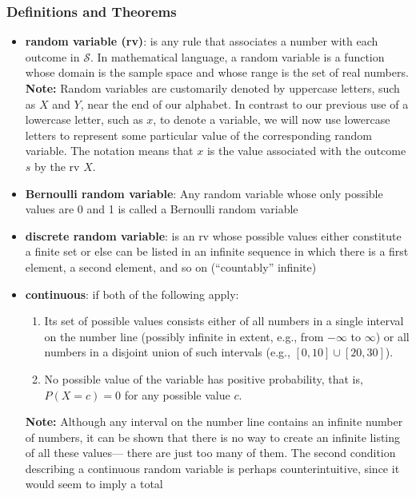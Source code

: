 \documentclass{report}
\begin{document}
    \subsubsection{Definitions and Theorems}
    \begin{itemize}
        \item \textbf{random variable (rv)}: is
            any rule that associates a number with each outcome in $\mathcal{S}$. In mathematical
            language, a random variable is a function whose domain is the sample space
            and whose range is the set of real numbers.
            \bigbreak \noindent 
            \textbf{Note:} Random variables are customarily denoted by uppercase letters, such as $X$ and
            $Y$, near the end of our alphabet. In contrast to our previous use of a lowercase letter,
            such as $x$, to denote a variable, we will now use lowercase letters to represent some
            particular value of the corresponding random variable. The notation means
            that $x$ is the value associated with the outcome $s$ by the rv $X$.
        \item \textbf{Bernoulli random variable}: Any random variable whose only possible values are 0 and 1 is called a Bernoulli random variable
        \item \textbf{discrete random variable}: is an rv whose possible values either constitute a finite set or else can be listed in an infinite sequence in which there is a first element, a second element, and so on (“countably” infinite)
        \item \textbf{continuous}: if both of the following apply:
        \begin{enumerate}
            \item Its set of possible values consists either of all numbers in a single interval on the number line (possibly infinite in extent, e.g., from $-\infty$ to $\infty$) or all numbers in a disjoint union of such intervals (e.g., $[0, 10] \cup [20, 30]$).
            \item No possible value of the variable has positive probability, that is, $P(X = c) = 0$ for any possible value $c$.
        \end{enumerate}
        \bigbreak \noindent 
        \textbf{Note:} Although any interval on the number line contains an infinite number of numbers, it
can be shown that there is no way to create an infinite listing of all these values—
there are just too many of them. The second condition describing a continuous random variable is perhaps counterintuitive, since it would seem to imply a total

\end{itemize}
\end{document}

